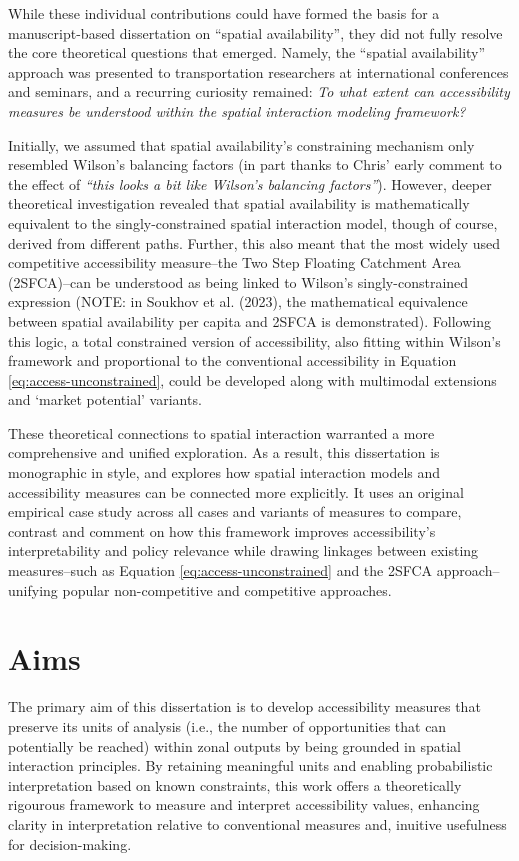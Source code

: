 \documentclass[
11pt, %
oneside, %
english, %
singlespacing, %
]{macthesis} %
\begin{document}
While these individual contributions could have formed the basis for a manuscript-based dissertation on ``spatial availability'', they did not fully resolve the core theoretical questions that emerged. Namely, the ``spatial availability'' approach was presented to transportation researchers at international conferences and seminars, and a recurring curiosity remained: \emph{To what extent can accessibility measures be understood within the spatial interaction modeling framework?}

Initially, we assumed that spatial availability's constraining mechanism only resembled Wilson's balancing factors (in part thanks to Chris' early comment to the effect of \emph{``this looks a bit like Wilson's balancing factors''}). However, deeper theoretical investigation revealed that spatial availability is mathematically equivalent to the singly-constrained spatial interaction model, though of course, derived from different paths. Further, this also meant that the most widely used competitive accessibility measure--the Two Step Floating Catchment Area (2SFCA)--can be understood as being linked to Wilson's singly-constrained expression (NOTE: in Soukhov et al. (2023), the mathematical equivalence between spatial availability per capita and 2SFCA is demonstrated). Following this logic, a total constrained version of accessibility, also fitting within Wilson's framework and proportional to the conventional accessibility in Equation \ref{eq:access-unconstrained}, could be developed along with multimodal extensions and `market potential' variants.

These theoretical connections to spatial interaction warranted a more comprehensive and unified exploration. As a result, this dissertation is monographic in style, and explores how spatial interaction models and accessibility measures can be connected more explicitly. It uses an original empirical case study across all cases and variants of measures to compare, contrast and comment on how this framework improves accessibility's interpretability and policy relevance while drawing linkages between existing measures--such as Equation \ref{eq:access-unconstrained} and the 2SFCA approach--unifying popular non-competitive and competitive approaches.

\section{Aims}\label{aims}

The primary aim of this dissertation is to develop accessibility measures that preserve its units of analysis (i.e., the number of opportunities that can potentially be reached) within zonal outputs by being grounded in spatial interaction principles. By retaining meaningful units and enabling probabilistic interpretation based on known constraints, this work offers a theoretically rigourous framework to measure and interpret accessibility values, enhancing clarity in interpretation relative to conventional measures and, inuitive usefulness for decision-making.
\end{document}
